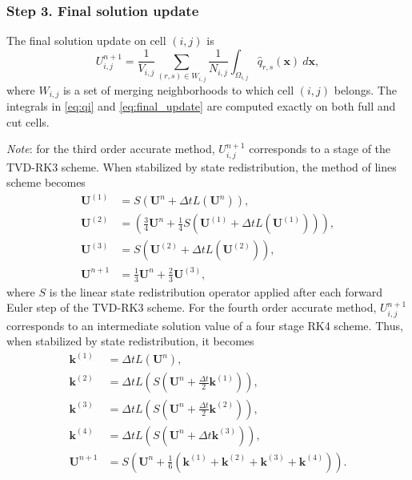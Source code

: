 \subsubsection*{Step 3. Final solution update}
The final solution update on cell $(i,j)$ is
	\begin{equation}\label{eq:final_update}
	U^{n+1}_{i,j} =  \frac{1}{V_{i,j}}\sum_{(r,s) \in W_{i,j}}\frac{1}{N_{i,j}}\int_{\Omega_{i,j}} \widehat q_{r,s}(\mathbf{x})~d\mathbf{x} ,
	\end{equation}
	where $W_{i,j}$ is a set of merging neighborhoods to which cell $(i,j)$ belongs.
The integrals in \eqref{eq:qi} and \eqref{eq:final_update} are computed exactly on both full and cut cells.  

\textit{Note}: for the third order accurate method, $U^{n+1}_{i,j}$ corresponds to a stage of the TVD-RK3 scheme.  
When stabilized by state redistribution, the method of lines scheme becomes
\begin{equation}\label{eq:molscheme_ho2_srd}
\begin{aligned}
\mathbf{U}^{(1)} &= S\left(\mathbf{U}^{n} + \Delta t L(\mathbf{U}^n) \right), \\
\mathbf{U}^{(2)} &=  \left(\frac{3}{4}\mathbf{U}^{n} + \frac{1}{4}S(\mathbf{U}^{(1)} + \Delta t L(\mathbf{U}^{(1)})) \right), \\
\mathbf{U}^{(3)} &= S\left(\mathbf{U}^{(2)} + \Delta t L(\mathbf{U}^{(2)}) \right),  \\
\mathbf{U}^{n+1} &= \frac{1}{3}\mathbf{U}^{n} + \frac{2}{3}\mathbf{U}^{(3)},	
\end{aligned}
\end{equation}
where $S$ is the linear state redistribution operator applied after each forward Euler step of the TVD-RK3 scheme.
For the fourth order accurate method, $U^{n+1}_{i,j}$ corresponds to an intermediate 
solution value of a four stage RK4 scheme.  Thus, when stabilized by state redistribution, 
it becomes 
\begin{equation}\label{eq:molscheme_ho4_srd}
\begin{aligned}
\mathbf{k}^{(1)} &= \Delta t L(\mathbf{U}^n), \\
\mathbf{k}^{(2)} &= \Delta t L \left(S\left(\mathbf{U}^n + \frac{\Delta t}{2} \mathbf{k}^{(1)}\right) \right), \\	
\mathbf{k}^{(3)} &= \Delta t L \left(S\left(\mathbf{U}^n + \frac{\Delta t}{2} \mathbf{k}^{(2)}\right) \right), \\	
\mathbf{k}^{(4)} &= \Delta t L \left(S\left(\mathbf{U}^n + \Delta t \mathbf{k}^{(3)} \right) \right), \\	
\mathbf{U}^{n+1} &= S\left(\mathbf{U}^n + \frac{1}{6}(\mathbf{k}^{(1)} + \mathbf{k}^{(2)}+ \mathbf{k}^{(3)}+ \mathbf{k}^{(4)})\right).
\end{aligned}
\end{equation}


